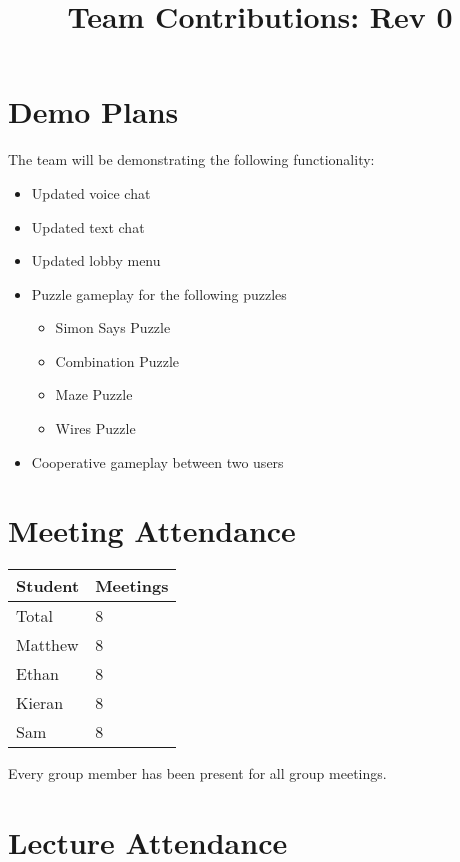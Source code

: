\documentclass{article}
\title{Team Contributions: Rev 0\\\progname}
\author{\authname}
\date{}
\begin{document}
\maketitle

\section{Demo Plans}

The team will be demonstrating the following functionality:
\begin{itemize}
    \item Updated voice chat
    \item Updated text chat
    \item Updated lobby menu
    \item Puzzle gameplay for the following puzzles
        \begin{itemize}
            \item Simon Says Puzzle
            \item Combination Puzzle
            \item Maze Puzzle
            \item Wires Puzzle
        \end{itemize}
    \item Cooperative gameplay between two users
\end{itemize}

\section{Meeting Attendance}

\begin{table}[H]
\centering
\begin{tabular}{ll}
\toprule
\textbf{Student} & \textbf{Meetings}\\
\midrule
Total & 8\\
Matthew & 8\\
Ethan & 8\\
Kieran & 8\\
Sam & 8\\
\bottomrule
\end{tabular}
\end{table}

Every group member has been present for all group meetings.

\section{Lecture Attendance}
\end{document}
